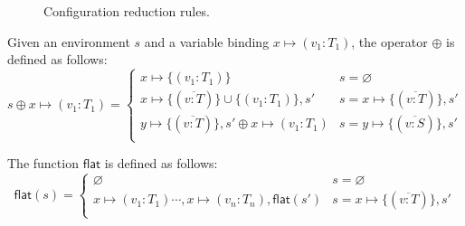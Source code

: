 \documentclass[preprint,authoryear,sort&compress,9pt,nocopyrightspace]{article}
\newcommand\rulename[1]{\mathsf{(#1)}}
\newcommand{\tto}{\longrightarrow}
\newcommand{\negacion}[1]{\mathsf{not} \ #1}
\newcommand{\suma}[1]{\mathsf{add1} \ #1}
\newcommand{\novalvar}[1]{\mathsf{notVal\_Var}(#1)}
\begin{document}
\begin{figure}
\begin{small}
\begin{center}
\begin{tabular}{|c r|}
&\\
\hline
\end{tabular}
\caption{Configuration reduction rules.}
\label{tabla:sencilla}
\end{center}
\end{small}
\end{figure}

\begin{definition}[$\oplus$]
\label{definition:tcs}
\mbox{}
Given an environment  $s$ and a variable binding $x \mapsto (v_1:T_1)$, the operator $\oplus$ is defined  as follows:
\[ s \oplus x \mapsto (v_1:T_1) = \begin{cases} 
      x \mapsto \{(v_1:T_1)\}& s =  \varnothing \\
      x \mapsto \{(\overline{v : T})\} \cup \{(v_1 : T_1)\}, s' & s = x \mapsto \{(\overline{v : T})\}, s'\\
      y \mapsto \{(\overline{v : T})\}, s' \oplus x \mapsto (v_1:T_1) & s = y \mapsto \{(\overline{v : S})\}, s'\\
   \end{cases}
\]
\end{definition}

\begin{definition}
\label{definition:tcs}
\mbox{}
The function $\mathsf{flat}$ is defined  as follows:
\[ \mathsf{flat}(s) = \begin{cases} 
      \varnothing & s =  \varnothing \\
      x \mapsto (v_1 : T_1) \cdots, x \mapsto (v_n : T_n),\mathsf{flat} (s') & s = x \mapsto \{(\overline{v : T})\}, s'\\
   \end{cases}
\]
\end{definition}
\end{document}
